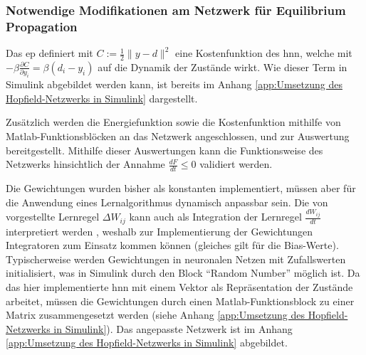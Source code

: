 \subsubsection{Notwendige Modifikationen am Netzwerk für Equilibrium Propagation}

Das \ac{ep} definiert mit \(C:=\frac{1}{2}\| y-d\| ^2\) eine Kostenfunktion des \ac{hnn}, welche mit \(-\beta\frac{\partial C}{\partial y_i}=\beta(d_i-y_i)\) auf die Dynamik der Zustände wirkt. Wie dieser Term in Simulink abgebildet werden kann, ist bereits im Anhang \ref{app:Umsetzung des Hopfield-Netzwerks in Simulink} dargestellt.

Zusätzlich werden die Energiefunktion sowie die Kostenfunktion mithilfe von Matlab-Funktionsblöcken an das Netzwerk angeschlossen, und zur Auswertung bereitgestellt. Mithilfe dieser Auswertungen kann die Funktionsweise des Netzwerks hinsichtlich der Annahme \(\frac{dF}{dt}\leq{0}\) \cite[vgl. S. 3]{Scellier2017} validiert werden.

Die Gewichtungen wurden bisher als konstanten implementiert, müssen aber für die Anwendung eines Lernalgorithmus dynamisch anpassbar sein. Die von \citeauthor{Scellier2017} vorgestellte Lernregel \(\Delta W_{ij}\) kann auch als Integration der Lernregel \(\frac{dW_{ij}}{dt}\) interpretiert werden \cite[vgl. S. 5]{Scellier2017}, weshalb zur Implementierung der Gewichtungen Integratoren zum Einsatz kommen können (gleiches gilt für die Bias-Werte). Typischerweise werden Gewichtungen in neuronalen Netzen mit Zufallswerten initialisiert, was in Simulink durch den Block "`Random Number"' möglich ist. Da das hier implementierte \ac{hnn} mit einem Vektor als Repräsentation der Zustände arbeitet, müssen die Gewichtungen durch einen Matlab-Funktionsblock zu einer Matrix zusammengesetzt werden (siehe Anhang \ref{app:Umsetzung des Hopfield-Netzwerks in Simulink}). Das angepasste Netzwerk ist im Anhang \ref{app:Umsetzung des Hopfield-Netzwerks in Simulink} abgebildet.
